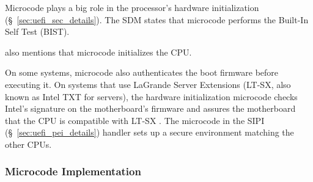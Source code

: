 



Microcode plays a big role in the processor's hardware initialization
(\S~\ref{sec:uefi_sec_details}). The SDM states that microcode performs the
Built-In Self Test (BIST).




\cite{intel2014vapic} also mentions that microcode initializes the CPU.




On some systems, microcode also authenticates the boot firmware
\cite{intel2012uefihypervisor} before executing it. On systems that use
LaGrande Server Extensions (LT-SX, also known as Intel TXT for servers), the
hardware initialization microcode checks Intel's signature on the motherboard's
firmware and assures the motherboard that the CPU is compatible with LT-SX
\cite{intel2012ltsx}. The microcode in the SIPI (\S~\ref{sec:uefi_pei_details})
handler sets up a secure environment matching the other CPUs.

\subsubsection{Microcode Implementation}





